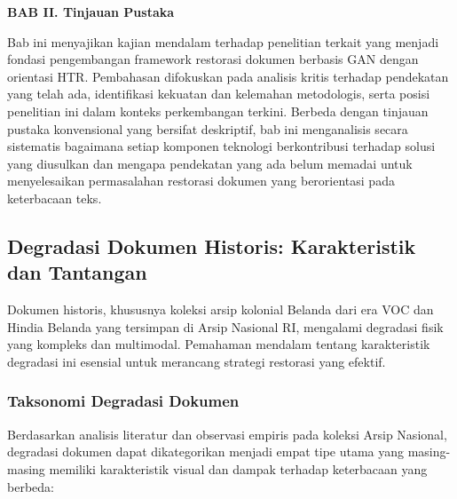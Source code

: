 \documentclass[12pt,a4paper]{article}
\begin{document}

\vspace{2cm}
\begin{center}
{\fontsize{14}{16.8}\selectfont\textbf{BAB II. Tinjauan Pustaka}}\\[1em]
\end{center}
\label{sec:pendahuluan}
\setcounter{section}{1}
\setcounter{subsection}{0}




\vspace{1.5ex}

Bab ini menyajikan kajian mendalam terhadap penelitian terkait yang menjadi fondasi pengembangan framework restorasi dokumen berbasis GAN dengan orientasi HTR. Pembahasan difokuskan pada analisis kritis terhadap pendekatan yang telah ada, identifikasi kekuatan dan kelemahan metodologis, serta posisi penelitian ini dalam konteks perkembangan terkini. Berbeda dengan tinjauan pustaka konvensional yang bersifat deskriptif, bab ini menganalisis secara sistematis bagaimana setiap komponen teknologi berkontribusi terhadap solusi yang diusulkan dan mengapa pendekatan yang ada belum memadai untuk menyelesaikan permasalahan restorasi dokumen yang berorientasi pada keterbacaan teks.

\subsection{Degradasi Dokumen Historis: Karakteristik dan Tantangan}
\label{subsec:degradasi-dokumen}


Dokumen historis, khususnya koleksi arsip kolonial Belanda dari era VOC dan Hindia Belanda yang tersimpan di Arsip Nasional RI, mengalami degradasi fisik yang kompleks dan multimodal. Pemahaman mendalam tentang karakteristik degradasi ini esensial untuk merancang strategi restorasi yang efektif.

\subsubsection{Taksonomi Degradasi Dokumen}
\label{subsubsec:taksonomi-degradasi}
Berdasarkan analisis literatur dan observasi empiris pada koleksi Arsip Nasional, degradasi dokumen dapat dikategorikan menjadi empat tipe utama yang masing-masing memiliki karakteristik visual dan dampak terhadap keterbacaan yang berbeda:
\end{document}
